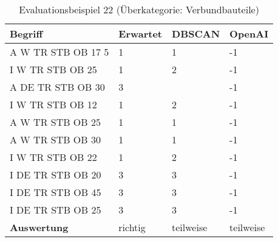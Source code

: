 \begin{table}[h]
	
	\centering
	\begin{tabular}{|l|l|l|l|}
		\hline
		\textbf{Begriff} & \textbf{Erwartet} & \textbf{DBSCAN} & \textbf{OpenAI}\\ \hline
		  A W TR STB OB 17 5 & 1 & 1 & -1 \\ \hline
		I W TR STB OB 25 & 1 & 2 & -1 \\ \hline
		A DE TR STB OB 30 & 3 & ~ & -1 \\ \hline
		I W TR STB OB 12 & 1 & 2 & -1 \\ \hline
		A W TR STB OB 25 & 1 & 1 & -1 \\ \hline
		A W TR STB OB 30 & 1 & 1 & -1 \\ \hline
		I W TR STB OB 22 & 1 & 2 & -1 \\ \hline
		I DE TR STB OB 20 & 3 & 3 & -1 \\ \hline
		I DE TR STB OB 45 & 3 & 3 & -1 \\ \hline
		I DE TR STB OB 25 & 3 & 3 & -1 \\ \hline
		\textbf{Auswertung} & richtig & teilweise & teilweise \\ \hline
	\end{tabular}
	\caption{Evaluationsbeispiel 22 (Überkategorie: Verbundbauteile)}
	\label{t:evaluation-example22}
\end{table}





